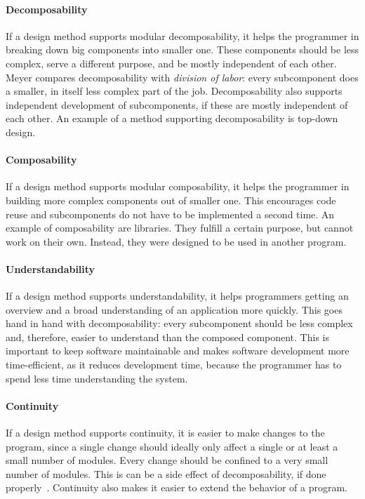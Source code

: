 \paragraph{Decomposability}
If a design method supports modular decomposability, it helps the programmer in breaking down big components into smaller one. These components should be less complex, serve a different purpose, and be mostly independent of each other. Meyer compares decomposability with \emph{division of labor}: every subcomponent does a smaller, in itself less complex part of the job. Decomposability also supports independent development of subcomponents, if these are mostly independent of each other. An example of a method supporting decomposability is top-down design.

\paragraph{Composability}
If a design method supports modular composability, it helps the programmer in building more complex components out of smaller one. This encourages code reuse and subcomponents do not have to be implemented a second time. An example of composability are libraries. They fulfill a certain purpose, but cannot work on their own. Instead, they were designed to be used in another program.

\paragraph{Understandability}
If a design method supports understandability, it helps programmers getting an overview and a broad understanding of an application more quickly. This goes hand in hand with decomposability: every subcomponent should be less complex and, therefore, easier to understand than the composed component. This is important to keep software maintainable and makes software development more time-efficient, as it reduces development time, because the programmer has to spend less time understanding the system.

\paragraph{Continuity}
If a design method supports continuity, it is easier to make changes to the program, since a single change should ideally only affect a single or at least a small number of modules. Every change should be confined to a very small number of modules. This is can be a side effect of decomposability, if done properly~\cite{Parnas:1972:CUD:361598.361623}. Continuity also makes it easier to extend the behavior of a program.

